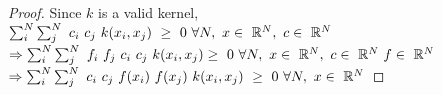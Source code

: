 \documentclass[10pt,a4paper]{amsart}
\renewcommand{\mathbf}[1]{%
  \ifx#1x x\else \textbf{#1}\fi
}
\begin{document}
\begin{proof} Since $k$ is a valid kernel, 
$\sum_i^N\sum_j^N~ c_i~c_j~k(\mathbf{x}_i,\mathbf{x}_j)~\geq~0 ~\forall N,~\mathbf{x}\in~\mathbb{R}^N, ~\mathbf{c}\in~\mathbb{R}^N$ \\
$\Rightarrow \sum_i^N\sum_j^N~ f_i~f_j~c_i~c_j~k(\mathbf{x}_i,\mathbf{x}_j) \\
\geq~0 ~\forall N,~\mathbf{x}\in~\mathbb{R}^N, ~\mathbf{c}\in~\mathbb{R}^N ~\mathbf{f}\in~\mathbb{R}^N$ \\
$\Rightarrow \sum_i^N\sum_j^N~c_i~c_j~f(\mathbf{x}_i)~f(\mathbf{x}_j)~k(\mathbf{x}_i,\mathbf{x}_j)~\geq~0~\forall N,~\mathbf{x}\in~\mathbb{R}^N$
\end{proof}
\end{document}
